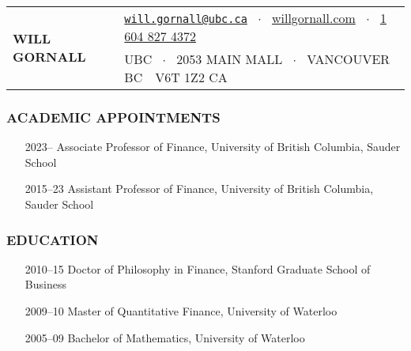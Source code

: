 \documentclass[11pt]{article}
\begin{document}
\noindent
\begin{tabular}{@{}l@{\quad\quad}l}
\multirow{2}{*}{\huge\textbf{WILL GORNALL}} & 
\href{mailto:will.gornall@sauder.ubc.ca}{\nolinkurl{will.gornall@ubc.ca}} \ $\cdot$ \
\href{willgornall.com}{willgornall.com} \ $\cdot$ \ 
\href{tel:1 604 827 4372}{1 604 827 4372} 
\\
&  
UBC \ $\cdot$ \
2053 MAIN MALL \ $\cdot$ \ 
VANCOUVER BC\ \ V6T 1Z2 CA
\end{tabular}


\subsubsection*{ACADEMIC APPOINTMENTS}
\begin{itemize}
    \item[2023--] Associate Professor of Finance, University of British Columbia, Sauder School
    \item[2015--23] Assistant Professor of Finance, University of British Columbia, Sauder School
\end{itemize}

\subsubsection*{EDUCATION}
\begin{itemize}
    \item[2010--15] Doctor of Philosophy in Finance, Stanford Graduate School of Business
    \item[2009--10] Master of Quantitative Finance, University of Waterloo
    \item[2005--09] Bachelor of Mathematics, University of Waterloo
\end{itemize}
\end{document}
